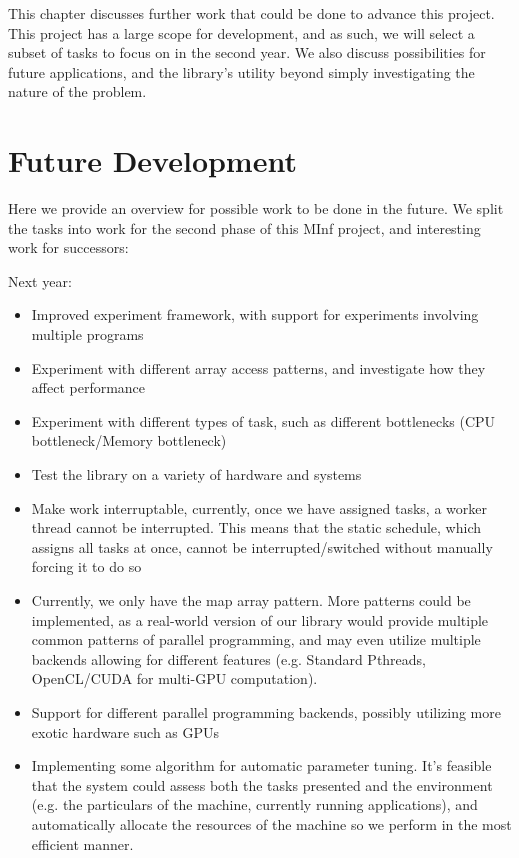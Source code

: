 
This chapter discusses further work that could be done to advance this project. This project has a large scope for development, and as such, we will select a subset of tasks to focus on in the second year. We also discuss possibilities for future applications, and the library's utility beyond simply investigating the nature of the problem.



\section{Future Development}

Here we provide an overview for possible work to be done in the future. We split the tasks into work for the second phase of this MInf project, and interesting work for successors:

Next year:

\begin{itemize}
	\item Improved experiment framework, with support for experiments involving multiple programs
	\item Experiment with different array access patterns, and investigate how they affect performance
	\item Experiment with different types of task, such as different bottlenecks (CPU bottleneck/Memory bottleneck) 
	\item Test the library on a variety of hardware and systems
	\item Make work interruptable, currently, once we have assigned tasks, a worker thread cannot be interrupted. This means that the static schedule, which assigns all tasks at once, cannot be interrupted/switched without manually forcing it to do so
	\item Currently, we only have the map array pattern. More patterns could be implemented, as a real-world version of our library would provide multiple common patterns of parallel programming, and may even utilize multiple backends allowing for different features (e.g. Standard Pthreads, OpenCL/CUDA for multi-GPU computation).
	\item Support for different parallel programming backends, possibly utilizing more exotic hardware such as GPUs 
	\item Implementing some algorithm for automatic parameter tuning. It's feasible that the system could assess both the tasks presented and the environment (e.g. the particulars of the machine, currently running applications), and automatically allocate the resources of the machine so we perform in the most efficient manner.
\end{itemize}

